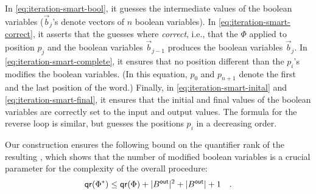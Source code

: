 In \cref{eq:iteration-smart-bool}, it guesses the intermediate
values of the boolean variables ($\vec{b}_j$'s denote vectors of $n$ boolean variables). 
In \cref{eq:iteration-smart-correct}, it asserts that the guesses where \emph{correct}, 
i.e., that the  $\Phi$ applied to position $p_j$ 
and the boolean variables $\vec{b}_{j-1}$ produces the boolean variables $\vec{b}_j$.
In \cref{eq:iteration-smart-complete}, it ensures that no position different than the $p_i$'s 
modifies the boolean variables.
(In this equation, $p_0$ and $p_{n+1}$ denote the first and the last position of the word.)
 Finally, in \cref{eq:iteration-smart-inital} and \cref{eq:iteration-smart-final},
it ensures that the initial and final values of the boolean variables are correctly set to the input and output values.
The formula for the reverse loop is similar, but guesses the positions $p_i$ in a decreasing order.

Our construction ensures the following bound on the quantifier rank of the resulting , 
which shows that the number of modified boolean variables is a crucial parameter for the complexity of the overall procedure:
\begin{equation}
    \label{eq:iteration-smart-quantifier-rank}
    \qrank(\Phi^*) 
    \leq \qrank(\Phi) 
    + |B^{\mathsf{out}}|^2
    + |B^{\mathsf{out}}|
    + 1 \quad .
\end{equation}